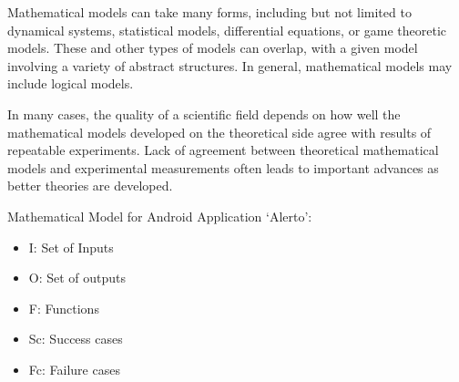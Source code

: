 \documentclass[12pt,a4paper]{report}
\begin{document}
	Mathematical models can take many forms, including but not limited to dynamical systems, statistical models, differential equations, or game theoretic models. These and other types of models can overlap, with a given model involving a variety of abstract structures. In general, mathematical models may include logical models.
	
	In many cases, the quality of a scientific field depends on how well the mathematical models developed on the theoretical side agree with results of repeatable experiments. Lack of agreement between theoretical mathematical models and experimental measurements often leads to important advances as better theories are developed.
	
	Mathematical Model for Android Application `Alerto':
	\begin{itemize}
		\item I: Set of Inputs
        \item O: Set of outputs
		\item F: Functions
		\item Sc: Success cases
		\item Fc: Failure cases\\
	\end{itemize}
	
\end{document}
